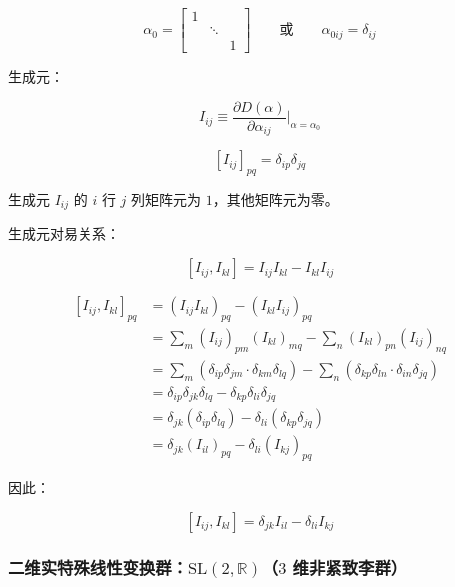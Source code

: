\begin{equation}
\alpha_0
=\begin{bmatrix}
1 & & \\
 &\ddots & \\
 & &1
\end{bmatrix}\qquad\text{或}\qquad
\alpha_{0ij}
=\delta_{ij}
\end{equation}

生成元：

\begin{equation}
I_{ij}
\equiv \frac{\partial D\left(\alpha\right) }{\partial \alpha_{ij} }\bigg|_{\alpha=\alpha_0}
\end{equation}

\begin{equation}
\left[I_{ij}\right]_{pq}
=\delta_{ip}\delta_{jq}
\end{equation}

生成元 $I_{ij}$ 的 $i$ 行 $j$ 列矩阵元为 $1$，其他矩阵元为零。

生成元对易关系：

\begin{equation}
\left[I_{ij},I_{kl}\right]
=I_{ij}I_{kl} - I_{kl}I_{ij}
\end{equation}

\begin{align}
\left[I_{ij},I_{kl}\right]_{pq}
&=\left(I_{ij}I_{kl}\right)_{pq} - \left(I_{kl}I_{ij}\right)_{pq} \\
&=\sum_{m} \left(I_{ij}\right)_{pm} \left(I_{kl}\right)_{mq} - \sum_{n} \left(I_{kl}\right)_{pn}\left(I_{ij}\right)_{nq} \\
&=\sum_{m} \left(\delta_{ip}\delta_{jm} \cdot \delta_{km}\delta_{lq} \right) - \sum_{n} \left(\delta_{kp}\delta_{ln} \cdot \delta_{in}\delta_{jq} \right) \\
&=\delta_{ip}\delta_{jk}\delta_{lq} - \delta_{kp}\delta_{li}\delta_{jq} \\
&=\delta_{jk}\left(\delta_{ip}\delta_{lq}\right) - \delta_{li}\left(\delta_{kp}\delta_{jq}\right) \\
&=\delta_{jk} \left(I_{il}\right)_{pq} - \delta_{li}\left(I_{kj}\right)_{pq} 
\end{align}

因此：

\begin{equation}
\left[I_{ij},I_{kl}\right]
=\delta_{jk} I_{il} - \delta_{li} I_{kj }
\end{equation}



\subsubsection*{\texorpdfstring{二维实特殊线性变换群：$\mathrm{SL}\left(2,\mathbb{R}\right)$（$3$ 维非紧致李群）}{二维实特殊线性变换群：SL(2,R)（3 维非紧致李群）}}

